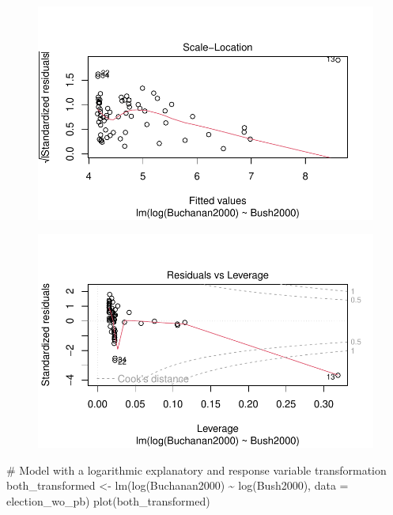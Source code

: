\documentclass[
  letterpaper,
  DIV=11,
  numbers=noendperiod]{scrartcl}
\newenvironment{Shaded}{\begin{snugshade}}{\end{snugshade}}
\newcommand{\AttributeTok}[1]{\textcolor[rgb]{0.40,0.45,0.13}{#1}}
\newcommand{\CommentTok}[1]{\textcolor[rgb]{0.37,0.37,0.37}{#1}}
\newcommand{\FunctionTok}[1]{\textcolor[rgb]{0.28,0.35,0.67}{#1}}
\newcommand{\NormalTok}[1]{\textcolor[rgb]{0.00,0.23,0.31}{#1}}
\newcommand{\OtherTok}[1]{\textcolor[rgb]{0.00,0.23,0.31}{#1}}
\newcommand{\SpecialCharTok}[1]{\textcolor[rgb]{0.37,0.37,0.37}{#1}}
\begin{document}
\begin{figure}[H]

{\centering \includegraphics{case_study_1_files/figure-pdf/unnamed-chunk-6-12.pdf}

}

\end{figure}

\begin{figure}[H]

{\centering \includegraphics{case_study_1_files/figure-pdf/unnamed-chunk-6-13.pdf}

}

\end{figure}

\begin{Shaded}
\begin{Highlighting}[]
\CommentTok{\# Model with a logarithmic explanatory and response variable transformation}
\NormalTok{both\_transformed }\OtherTok{\textless{}{-}} \FunctionTok{lm}\NormalTok{(}\FunctionTok{log}\NormalTok{(Buchanan2000) }\SpecialCharTok{\textasciitilde{}} \FunctionTok{log}\NormalTok{(Bush2000), }\AttributeTok{data =}\NormalTok{ election\_wo\_pb)}
\FunctionTok{plot}\NormalTok{(both\_transformed)}
\end{Highlighting}
\end{Shaded}
\end{document}
